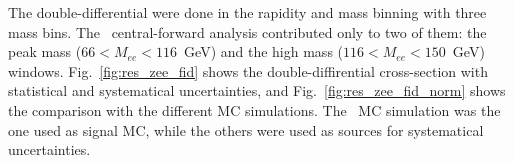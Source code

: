 The double-differential were done in the rapidity and mass binning with three mass bins. The \Zee\ central-forward analysis contributed only to two of them: the peak mass ($66 < M_{ee} < 116$~GeV) and the high mass ($116 < M_{ee} < 150$~GeV) windows. Fig.~\ref{fig:res_zee_fid} shows the double-diffirential cross-section with statistical and systematical uncertainties, and Fig.~\ref{fig:res_zee_fid_norm} shows the comparison with the different MC simulations. The \Powheg\Pythia\ MC simulation was the one used as signal MC, while the others were used as sources for systematical uncertainties.

\begin{figure}
\end{figure}

